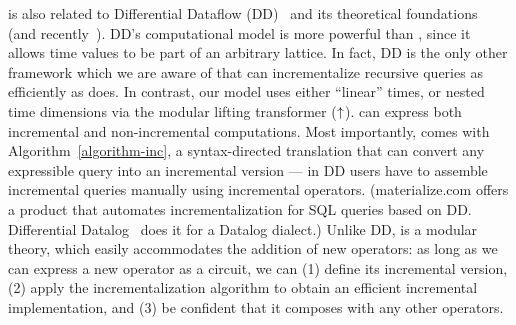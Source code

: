 \dbsp is also related to Differential Dataflow (DD)~\cite{mcsherry-cidr13, murray-sosp13}
and its theoretical foundations~\cite{abadi-fossacs15} (and recently~\cite{mcsherry-vldb20,chothia-vldb16}).
DD's computational model is more powerful than
\dbsp, since it allows time values to be part of an arbitrary lattice.
In fact, DD is the only other framework which we are aware of that can incrementalize
recursive queries as efficiently as \dbsp does.
In contrast, our model uses either ``linear'' times, or nested time dimensions via the modular lifting transformer (${\uparrow}$).
\dbsp can express both
incremental and non-incremental computations.  Most importantly, \dbsp comes with Algorithm~\ref{algorithm-inc}, a syntax-directed translation that can convert
any expressible query into an incremental version --- in DD users have
to assemble incremental queries manually using incremental operators.
(materialize.com offers a product that automates incrementalization
for SQL queries based on DD.  Differential Datalog~\cite{ryzhyk-datalog19}
does it for a Datalog dialect.)  Unlike DD, \dbsp is a modular theory,
which easily accommodates the addition of new operators:  as long as we can
express a new operator as a \dbsp circuit, we can (1) define its incremental version,
(2) apply the incrementalization algorithm to obtain an efficient
incremental implementation, and (3) be confident that it composes with any
other operators.
